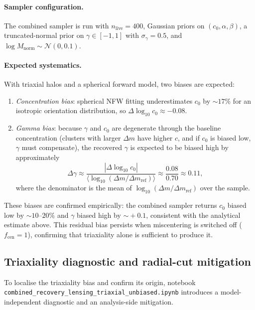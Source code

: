 \documentclass[12pt,a4paper]{article}
\begin{document}
\paragraph{Sampler configuration.}
The combined sampler is run with $n_\mathrm{live}=400$, Gaussian priors on
$(c_0, \alpha, \beta)$, a truncated-normal prior on $\gamma\in[-1,1]$ with
$\sigma_\gamma=0.5$, and $\log M_\mathrm{norm}\sim\mathcal{N}(0, 0.1)$.

\paragraph{Expected systematics.}
With triaxial halos and a spherical forward model, two biases are expected:
\begin{enumerate}
  \item \textit{Concentration bias}: spherical NFW fitting underestimates $c_0$
    by $\sim\!17\%$ for an isotropic orientation distribution, so
    $\Delta\log_{10}c_0 \approx -0.08$.
  \item \textit{Gamma bias}: because $\gamma$ and $c_0$ are degenerate through
    the baseline concentration (clusters with larger $\Delta m$ have higher $c$,
    and if $c_0$ is biased low, $\gamma$ must compensate), the recovered $\gamma$
    is expected to be biased high by approximately
    \begin{equation}
      \Delta\gamma \approx
        \frac{|\Delta\log_{10}c_0|}{\langle\log_{10}(\Delta m/\Delta m_\mathrm{ref})\rangle}
        \approx \frac{0.08}{0.70} \approx 0.11,
    \end{equation}
    where the denominator is the mean of $\log_{10}(\Delta m/\Delta m_\mathrm{ref})$
    over the sample.
\end{enumerate}
These biases are confirmed empirically: the combined sampler returns $c_0$
biased low by $\sim\!10$--$20\%$ and $\gamma$ biased high by $\sim\!+0.1$,
consistent with the analytical estimate above.  This residual bias persists
when miscentering is switched off ($f_\mathrm{cen}=1$), confirming that
triaxiality alone is sufficient to produce it.

\subsection{Triaxiality diagnostic and radial-cut mitigation}
\label{sec:unbiased}

To localise the triaxiality bias and confirm its origin, notebook
\texttt{combined\_recovery\_lensing\_triaxial\_unbiased.ipynb} introduces a
model-independent diagnostic and an analysis-side mitigation.
\end{document}
